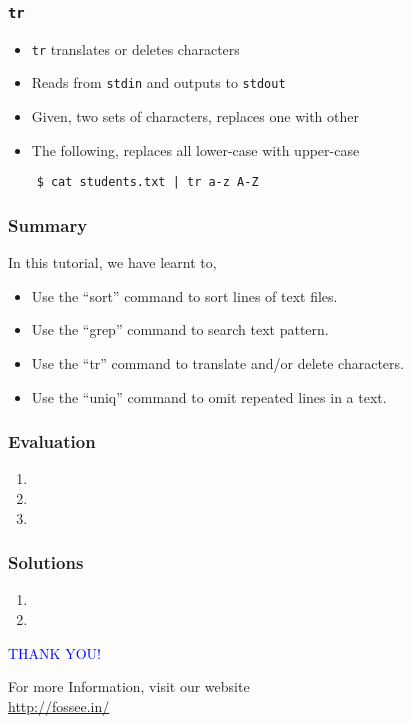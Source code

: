 \documentclass[12pt,compress]{beamer}
\begin{document}
\begin{frame}[fragile]
  \frametitle{\texttt{tr}}
  \begin{itemize}
  \item \texttt{tr} translates or deletes characters
  \item Reads from \texttt{stdin} and outputs to \texttt{stdout}
  \item Given, two sets of characters, replaces one with other
  \item The following, replaces all lower-case with upper-case 
  \end{itemize}
  \begin{lstlisting}
    $ cat students.txt | tr a-z A-Z
  \end{lstlisting} %
\end{frame}

\begin{frame}
\frametitle{Summary}
\label{sec-8}

  In this tutorial, we have learnt to,


\begin{itemize}
\item Use the ``sort'' command to sort lines of text files. 
\item Use the ``grep'' command to search text pattern.
\item Use the ``tr'' command to translate and/or delete characters.
\item Use the ``uniq'' command to omit repeated lines in a text. 
\end{itemize}
\end{frame}
\begin{frame}[fragile]
\frametitle{Evaluation}
\label{sec-9}


\begin{enumerate}
\item 
\item 
\item 
\end{enumerate}
\end{frame}
\begin{frame}
\frametitle{Solutions}
\label{sec-10}


\begin{enumerate}
\item 
\vspace{15pt}
\item 
\end{enumerate}
\end{frame}
\begin{frame}

  \begin{block}{}
  \begin{center}
  \textcolor{blue}{\Large THANK YOU!} 
  \end{center}
  \end{block}
\begin{block}{}
  \begin{center}
    For more Information, visit our website\\
    \url{http://fossee.in/}
  \end{center}  
  \end{block}
\end{frame}
\end{document}
